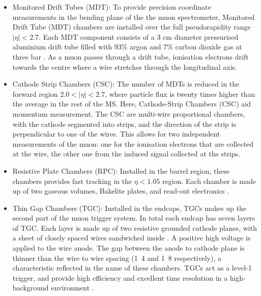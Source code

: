 \begin{itemize}
    \item Monitored Drift Tubes (MDT): To provide precision coordinate measurements in the bending plane of the the muon spectrometer, Monitored Drift Tube (MDT) chambers are installed over the full pseudorapidity range $|\eta| < 2.7$. Each MDT component consists of a 3 cm diameter pressurised aluminium drift tube filled with 93\% argon and 7\% carbon dioxide gas at three bar \cite{LEVIN2008347}. As a muon passes through a drift tube, ionisation electrons drift towards the centre where a wire stretches through the longitudinal axis. 
    \item Cathode Strip Chambers (CSC): The number of MDTs is reduced in the forward region $2.0 < |\eta| < 2.7$, where particle flux is twenty times higher than the average in the rest of the MS. Here, Cathode-Strip Chambers (CSC) aid momentum measurement. The CSC are multi-wire proportional chambers, with the cathode segmented into strips, and the direction of the strip is perpendicular to one of the wires. This allows for two independent measurements of the muon: one for the ionisation electrons that are collected at the wire, the other one from the induced signal collected at the strips.  %
    \item Resistive Plate Chambers (RPC): Installed in the barrel region, these chambers provides fast tracking in the $\eta<1.05$ region. Each chamber is made up of two gaseous volumes, Bakelite plates, and read-out electronics \cite{PALESTINI2003337}. 
    \item Thin Gap Chambers (TGC): Installed in the endcaps, TGCs makes up the second part of the muon trigger system. In total each endcap has seven layers  of TGC. Each layer is made up of two resistive grounded cathode planes, with a sheet of closely spaced wires sandwiched inside \cite{Etzion}. A positive high voltage is applied to the wire anode. The gap between the anode to cathode plane is thinner than the wire to wire spacing (\unit{1.4}{\milli\meter} and \unit{1.8}{\milli\meter} respectively), a characteristic reflected in the name of these chambers. TGCs act as a level-1 trigger, and provide high efficiency and excellent time resolution in a high-background environment \cite{NAGAI1996219}.

\end{itemize}
